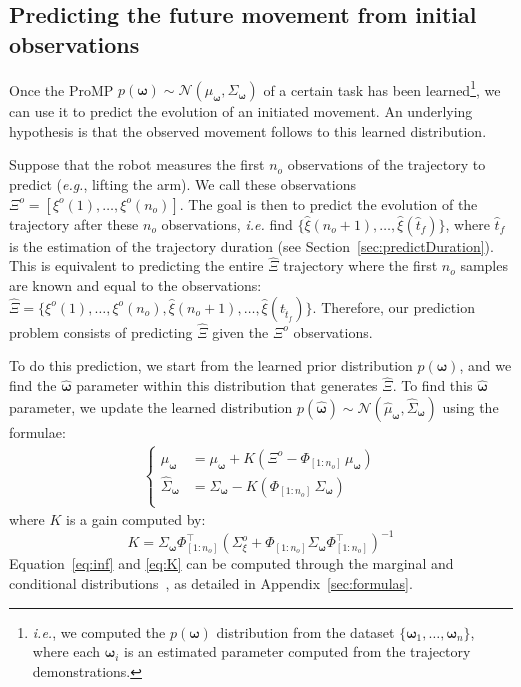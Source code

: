 \documentclass[utf8]{frontiersSCNS} %
\begin{document}
\subsection{Predicting the future movement from initial observations} \label{sec:predict}

Once the ProMP  $p(\boldsymbol{\omega}) \sim \mathcal{N}(\mu_{\boldsymbol{\omega}}, \Sigma_{\boldsymbol{\omega}})$ of a certain task has been learned\footnote{\textit{i.e.}, we computed the $p(\boldsymbol{\omega})$ distribution from the dataset $\{\boldsymbol{\omega}_1, \ldots, \boldsymbol{\omega}_n\}$, where each $\boldsymbol{\omega}_i$ is an estimated parameter computed from the trajectory demonstrations.}, we can use it to predict the evolution of an initiated movement. An underlying hypothesis is that the observed movement follows to this learned distribution.

Suppose that the robot measures the first $n_o$ observations of the trajectory to predict (\textit{e.g.}, lifting the arm). We call these observations $\Xi^o=[\xi^o(1),\ldots, \xi^o({n_o})].$
The goal is then to predict the evolution of the trajectory after these ${n_o}$ observations, \textit{i.e.} find $\{\hat{\xi}({n_o+1}),\ldots,\hat{\xi}(\hat{t}_f)\}$, where $\hat{t}_f$ is the estimation of the trajectory duration (see Section~\ref{sec:predictDuration}). 
This is equivalent to predicting the entire $\hat{\Xi}$ trajectory where the first $n_o$ samples are known and equal to the observations: $\hat{\Xi} = \{\xi^o({1}), \ldots, \xi^o({n_o}), \hat{\xi}({n_o+1}), \ldots, \hat{\xi}(t_{\hat{t}_f})\}$.
Therefore, our prediction problem consists of predicting $\hat{\Xi}$ given the $\Xi^o$ observations. 

To do this prediction, we start from the learned prior distribution $p(\boldsymbol{\omega})$, and we find the $\hat{\boldsymbol{\omega}}$ parameter within this distribution that generates $\hat{\Xi}$. To find this $\hat{\boldsymbol{\omega}}$ parameter, we update the learned distribution $p(\hat{\boldsymbol{\omega}}) \sim \mathcal{N}(\hat{\mu}_{\boldsymbol{\omega}},\hat{\Sigma}_{\boldsymbol{\omega}})$ using the formulae:
\begin{eqnarray} \label{eq:inf}
\left\{
\begin{array}{rl}
\hat{\mu}_{\boldsymbol{\omega}} &= \mu_{\boldsymbol{\omega}} + K(\Xi^o - \Phi_{[1:n_o]} \, \mu_{\boldsymbol{\omega}}) \\ 
\hat{\Sigma}_{\boldsymbol{\omega}} &= \Sigma_{\boldsymbol{\omega}} - K(\Phi_{[1:n_o]} \, \Sigma_{\boldsymbol{\omega}}) \\
\end{array}
\right.
\end{eqnarray}
where $K$ is a gain computed by:
\begin{equation}\label{eq:K}
K= \Sigma_{\boldsymbol{\omega}}\Phi_{[1:n_o]}^\top(\Sigma_\xi^o + \Phi_{[1:n_o]}\Sigma_{\boldsymbol{\omega}} \Phi_{[1:n_o]}^\top)^{-1}
\end{equation}
Equation~\ref{eq:inf} and \ref{eq:K} can be computed through the marginal and conditional distributions~\cite{paraschos2013probabilistic, Bishop:2006}, as detailed in Appendix~\ref{sec:formulas}.
\end{document}

